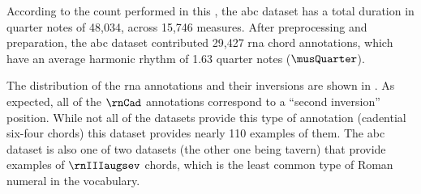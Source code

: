 
According to the count performed in this \thesisdiss{}, the
\gls{abc} dataset has a total duration in quarter notes of
48,034, across 15,746 measures. After preprocessing and
preparation, the \gls{abc} dataset contributed 29,427
\gls{rna} chord annotations, which have an average harmonic
rhythm of 1.63 quarter notes ($\musQuarter$).

The distribution of the \gls{rna} annotations and their
inversions are shown in . As
expected, all of the $\rnCad$ annotations correspond to a
``second inversion'' position. While not all of the datasets
provide this type of annotation (cadential six-four chords)
this dataset provides nearly 110 examples of them. The
\gls{abc} dataset is also one of two datasets (the other one
being \gls{tavern}) that provide examples of $\rnIIIaugsev$
chords, which is the least common type of Roman numeral in
the vocabulary.









